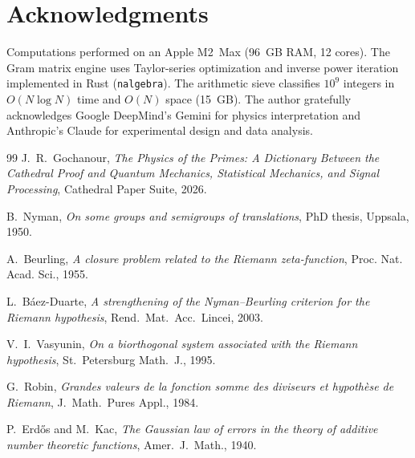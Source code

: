 \documentclass[11pt,a4paper]{article}
\begin{document}
\section*{Acknowledgments}

Computations performed on an Apple M2~Max (96~GB RAM, 12 cores).
The Gram matrix engine uses Taylor-series optimization and inverse
power iteration implemented in Rust (\texttt{nalgebra}).
The arithmetic sieve classifies $10^9$ integers in $O(N \log N)$ time
and $O(N)$ space (15~GB).
The author gratefully acknowledges Google DeepMind's Gemini for
physics interpretation and Anthropic's Claude for experimental
design and data analysis.

\begin{thebibliography}{99}
 J.~R.~Gochanour, \emph{The Physics of the
  Primes: A Dictionary Between the Cathedral Proof and Quantum Mechanics,
  Statistical Mechanics, and Signal Processing}, Cathedral Paper Suite, 2026.

 B.~Nyman, \emph{On some groups and semigroups of
  translations}, PhD thesis, Uppsala, 1950.

 A.~Beurling, \emph{A closure problem related to the
  Riemann zeta-function}, Proc. Nat. Acad. Sci., 1955.

 L.~B\'aez-Duarte, \emph{A strengthening of the
  Nyman--Beurling criterion for the Riemann hypothesis}, Rend.~Mat.~Acc.~Lincei, 2003.

 V.~I.~Vasyunin, \emph{On a biorthogonal system
  associated with the Riemann hypothesis}, St.~Petersburg Math.~J., 1995.

 G.~Robin, \emph{Grandes valeurs de la fonction somme
  des diviseurs et hypoth\`ese de Riemann}, J.~Math.~Pures Appl., 1984.

 P.~Erd\H{o}s and M.~Kac, \emph{The Gaussian law of
  errors in the theory of additive number theoretic functions},
  Amer.~J.~Math., 1940.
\end{thebibliography}
\end{document}
